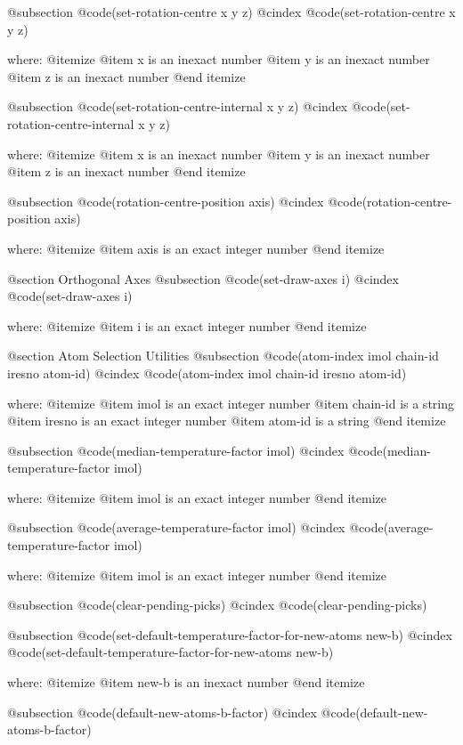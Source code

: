 @subsection @code{(set-rotation-centre x y z)}
@cindex @code{(set-rotation-centre x y z)}
 
where: 
 @itemize 
     @item x is an inexact number
     @item y is an inexact number
     @item z is an inexact number
 @end itemize


@subsection @code{(set-rotation-centre-internal x y z)}
@cindex @code{(set-rotation-centre-internal x y z)}
 
where: 
 @itemize 
     @item x is an inexact number
     @item y is an inexact number
     @item z is an inexact number
 @end itemize


@subsection @code{(rotation-centre-position axis)}
@cindex @code{(rotation-centre-position axis)}
 
where: 
 @itemize 
     @item axis is an exact integer number
 @end itemize



@section Orthogonal Axes 
@subsection @code{(set-draw-axes i)}
@cindex @code{(set-draw-axes i)}
 
where: 
 @itemize 
     @item i is an exact integer number
 @end itemize



@section Atom Selection Utilities 
@subsection @code{(atom-index imol chain-id iresno atom-id)}
@cindex @code{(atom-index imol chain-id iresno atom-id)}
 
where: 
 @itemize 
     @item imol is an exact integer number
     @item chain-id is a string
     @item iresno is an exact integer number
     @item atom-id is a string
 @end itemize


@subsection @code{(median-temperature-factor imol)}
@cindex @code{(median-temperature-factor imol)}
 
where: 
 @itemize 
     @item imol is an exact integer number
 @end itemize


@subsection @code{(average-temperature-factor imol)}
@cindex @code{(average-temperature-factor imol)}
 
where: 
 @itemize 
     @item imol is an exact integer number
 @end itemize


@subsection @code{(clear-pending-picks)}
@cindex @code{(clear-pending-picks)}
 
@subsection @code{(set-default-temperature-factor-for-new-atoms new-b)}
@cindex @code{(set-default-temperature-factor-for-new-atoms new-b)}
 
where: 
 @itemize 
     @item new-b is an inexact number
 @end itemize


@subsection @code{(default-new-atoms-b-factor)}
@cindex @code{(default-new-atoms-b-factor)}
 

